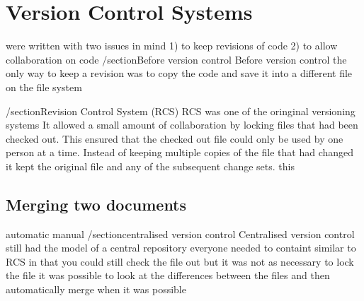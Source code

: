 \chapter{Version Control Systems}




were written with two issues in mind
1) to keep revisions of code
2) to allow collaboration on code
/section{Before version control}
Before version control the only way to keep a revision was to copy the code and save it into a different file on the file system

/section{Revision Control System (RCS)}
RCS was one of the oringinal versioning systems 
It allowed a small amount of collaboration by locking files that had been checked out.
This ensured that the checked out file could only be used by one person at a time.
Instead of keeping multiple copies of the file that had changed it kept the original file and any of the subsequent change sets.
this 
\section{Merging two documents}
automatic manual
/section{centralised version control}
Centralised version control
still had the model of a central repository everyone needed to containt
similar to RCS in that you could still check the file out but it was not as necessary to lock the file
it was possible to look at the differences between the files and then automatically merge when it was possible
